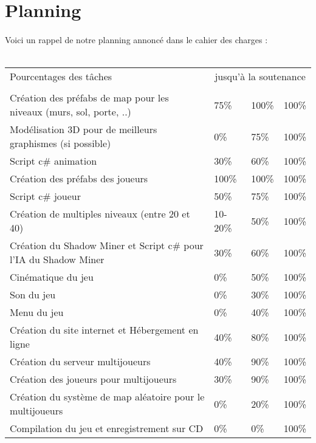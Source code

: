 \documentclass[titlepage, 13px, a4paper]{report}
\begin{document}
\newpage

\section{Planning}
\paragraph{} \hspace{0pt}
Voici un rappel de notre planning annoncé dans le cahier des charges :
\\ \\
{\small
	\begin{tabular}{|p{7.2cm}|p{1.2cm}|p{1.2cm}|p{1.2cm}|}
		\hline
		Pourcentages des tâches & \multicolumn{3}{|c|}{jusqu'à la soutenance} \\ 
		\cline{2-4}
			& \no 1 & \no 2 & \no 3 \\
		\hline
		Création des préfabs de map pour les niveaux (murs, sol, porte, ..) & 75\% & 100\% & 100\% \\
		\hline
		Modélisation 3D pour de meilleurs graphismes (si possible) & 0\% & 75\% & 100\% \\
		\hline
		Script c\# animation & 30\% & 60\% & 100\% \\
		\hline
		Création des préfabs des joueurs & 100\% & 100\% & 100\% \\
		\hline
		Script c\# joueur & 50\% & 75\% & 100\% \\
		\hline
		Création de multiples niveaux (entre 20 et 40) & 10-20\% & 50\% & 100\% \\
		\hline
		Création du Shadow Miner et Script c\# pour l'IA du Shadow Miner & 30\% & 60\% & 100\% \\
		\hline
		Cinématique du jeu & 0\% & 50\% & 100\% \\
		\hline
		Son du jeu & 0\% & 30\% & 100\% \\
		\hline
		Menu du jeu & 0\% & 40\% & 100\% \\
		\hline
		Création du site internet et Hébergement en ligne & 40\% & 80\% & 100\% \\
		\hline
		Création du serveur multijoueurs & 40\% & 90\% & 100\% \\
		\hline
		Création des joueurs pour multijoueurs & 30\% & 90\% & 100\% \\
		\hline
		Création du système de map aléatoire pour le multijoueurs & 0\% & 20\% & 100\% \\
		\hline
		Compilation du jeu et enregistrement sur CD & 0\% & 0\% & 100\% \\
		\hline 
		\end{tabular}
	\label{Planning}	
}
\end{document}
